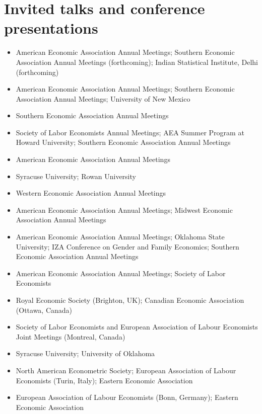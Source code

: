 \documentclass[10.5pt]{article}
\begin{document}
\section{Invited talks and conference presentations}
\begin{itemize}
\item[\textbf{2026}] American Economic Association Annual Meetings; Southern Economic Association Annual Meetings (forthcoming); Indian Statistical Institute, Delhi (forthcoming)
\item[\textbf{2025}] American Economic Association Annual Meetings; Southern Economic Association Annual Meetings; University of New Mexico
\item[\textbf{2024}] Southern Economic Association Annual Meetings
\item[\textbf{2023}] Society of Labor Economists Annual Meetings; AEA Summer Program at Howard University; Southern Economic Association Annual Meetings
\item[\textbf{2022}] American Economic Association Annual Meetings
\item[\textbf{2021}] Syracuse University; Rowan University
\item[\textbf{2020}] Western Economic Association Annual Meetings
\item[\textbf{2019}] American Economic Association Annual Meetings; Midwest Economic Association Annual Meetings
\item[\textbf{2018}] American Economic Association Annual Meetings; Oklahoma State University; IZA Conference on Gender and Family Economics; Southern Economic Association Annual Meetings
\item[\textbf{2017}] American Economic Association Annual Meetings; Society of Labor Economists
\item[\textbf{2016}] Royal Economic Society (Brighton, UK); Canadian Economic Association (Ottawa, Canada)
\item[\textbf{2015}] Society of Labor Economists and European Association of Labour Economists Joint Meetings (Montreal, Canada)
\item[\textbf{2014}] Syracuse University; University of Oklahoma
\item[\textbf{2013}] North American Econometric Society; European Association of Labour Economists (Turin, Italy); Eastern Economic Association
\item[\textbf{2012}] European Association of Labour Economists (Bonn, Germany); Eastern Economic Association
\end{itemize}
\end{document}
